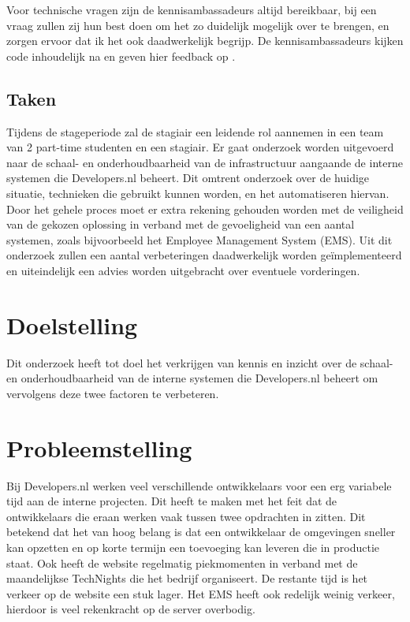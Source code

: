 Voor technische vragen zijn de kennisambassadeurs altijd bereikbaar, bij een vraag zullen zij hun best doen om het zo duidelijk mogelijk over te brengen, en zorgen ervoor dat ik het ook daadwerkelijk begrijp. De kennisambassadeurs kijken code inhoudelijk na en geven hier feedback op \parencite{Stageplan}.

\subsection{Taken}
Tijdens de stageperiode zal de stagiair een leidende rol aannemen in een team van 2 part-time studenten en een stagiair. Er gaat onderzoek worden uitgevoerd naar de schaal- en onderhoudbaarheid van de infrastructuur aangaande de interne systemen die Developers.nl beheert. Dit omtrent onderzoek over de huidige situatie, technieken die gebruikt kunnen worden, en het automatiseren hiervan. Door het gehele proces moet er extra rekening gehouden worden met de veiligheid van de gekozen oplossing in verband met de gevoeligheid van een aantal systemen, zoals bijvoorbeeld het Employee Management System (EMS). Uit dit onderzoek zullen een aantal verbeteringen daadwerkelijk worden geïmplementeerd en uiteindelijk een advies worden uitgebracht over eventuele vorderingen.

\section{Doelstelling}

Dit onderzoek heeft tot doel het verkrijgen van kennis en inzicht over de schaal- en onderhoudbaarheid van de interne systemen die Developers.nl beheert om vervolgens deze twee factoren te verbeteren.


\section{Probleemstelling}
Bij Developers.nl werken veel verschillende ontwikkelaars voor een erg variabele tijd aan de interne projecten. Dit heeft te maken met het feit dat de ontwikkelaars die eraan werken vaak tussen twee opdrachten in zitten. Dit betekend dat het van hoog belang is dat een ontwikkelaar de omgevingen sneller kan opzetten en op korte termijn een toevoeging kan leveren die in productie staat. Ook heeft de website regelmatig piekmomenten in verband met de maandelijkse TechNights die het bedrijf organiseert. De restante tijd is het verkeer op de website een stuk lager. Het EMS heeft ook redelijk weinig verkeer, hierdoor is veel rekenkracht op de server overbodig.

